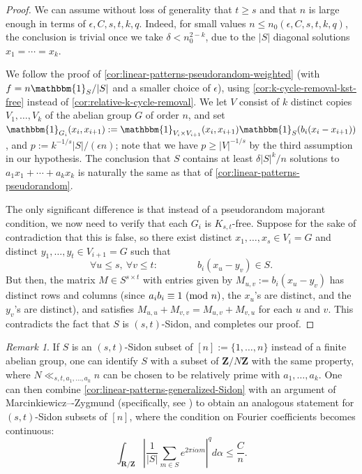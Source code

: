 \documentclass[reqno,11pt]{amsart}
\theoremstyle{definition}
\theoremstyle{remark}
\newtheorem*{remark}{Remark}
\numberwithin{equation}{section}
\newcommand{\Z}{\mathbf{Z}}
\newcommand{\R}{\mathbf{R}}
\newcommand{\one}{\mathbbm{1}}
\renewcommand{\pmod}[1]{\ (\textnormal{mod } #1)}
\begin{document}
\begin{proof}
We can assume without loss of generality that $t \ge s$ and that $n$ is large enough in terms of $\epsilon, C, s, t, k, q$. Indeed, for small values $n \le n_0(\epsilon, C, s, t, k, q)$, the conclusion is trivial once we take $\delta < n_0^{2-k}$, due to the $|S|$ diagonal solutions $x_1 = \cdots = x_k$.

We follow the proof of \cref{cor:linear-patterns-pseudorandom-weighted} (with $f = n\one_S/|S|$ and a smaller choice of $\epsilon$), using \cref{cor:k-cycle-removal-kst-free} instead of \cref{cor:relative-k-cycle-removal}. We let $V$ consist of $k$ distinct copies $V_1, \ldots, V_k$ of the abelian group $G$ of order $n$, and set $\one_{G_i}(x_i,x_{i+1}) := \one_{V_i \times V_{i+1}}(x_i, x_{i+1}) \one_S(b_i(x_i - x_{i+1}))$, and $p := k^{-1/s}|S|/(\epsilon n)$; note that we have $p \ge |V|^{-1/s}$ by the third assumption in our hypothesis. The conclusion that $S$ contains at least $\delta |S|^k/n$ solutions to $a_1 x_1 + \cdots + a_k x_k$ is naturally the same as that of \cref{cor:linear-patterns-pseudorandom}.

The only significant difference is that instead of a pseudorandom majorant condition, we now need to verify that each $G_i$ is $K_{s,t}$-free. Suppose for the sake of contradiction that this is false, so there exist distinct $x_1, \ldots, x_s \in V_i = G$ and distinct $y_1, \ldots, y_t \in V_{i+1} = G$ such that
\[
    \forall u \le s,\ \forall v \le t: \qquad \qquad 
    b_i(x_u - y_v) \in S.
\]
But then, the matrix $M \in S^{s \times t}$ with entries given by $M_{u,v} := b_i(x_u - y_v)$ has distinct rows and columns (since $a_i b_i \equiv 1 \pmod{n}$, the $x_u$'s are distinct, and the $y_v$'s are distinct), and satisfies $M_{u,u} + M_{v,v} = M_{u,v} + M_{v,u}$ for each $u$ and $v$. This contradicts the fact that $S$ is $(s, t)$-Sidon, and completes our proof.
\end{proof}


\begin{remark}
If $S$ is an $(s,t)$-Sidon subset of $[n] := \{1, \ldots, n\}$ instead of a finite abelian group, one can identify $S$ with a subset of $\Z/N\Z$ with the same property, where $N \ll_{s,t,a_1,\ldots,a_k} n$ can be chosen to be relatively prime with $a_1, \ldots, a_k$. One can then combine \cref{cor:linear-patterns-generalized-Sidon} with an argument of Marcinkiewicz–-Zygmund \cite{zygmund2002trigonometric} (specifically, see \cite[Lemma 6.5]{green2005roth}) to obtain an analogous statement for $(s, t)$-Sidon subsets of $[n]$, where the condition on Fourier coefficients becomes continuous:
\[
    \int_{\R/\Z} \left\vert \frac{1}{|S|} \sum_{m \in S} e^{2\pi i \alpha m} \right\vert^q d\alpha  \le \frac{C}{n}.
\]
\end{remark}
\end{document}
